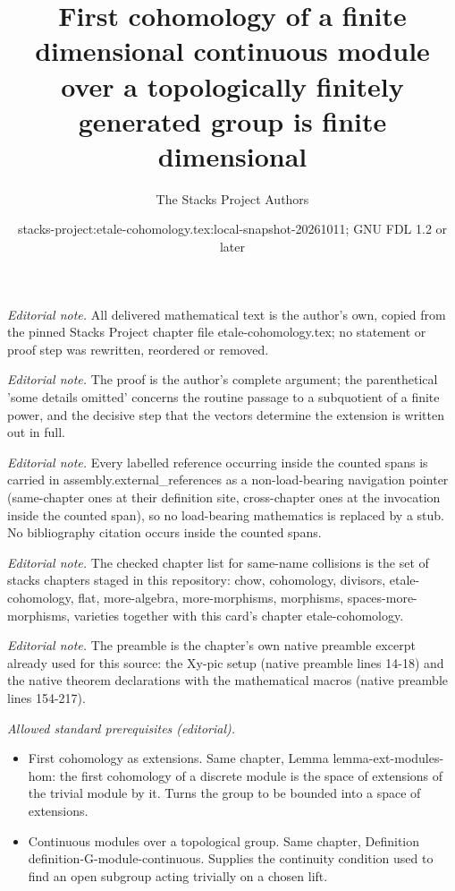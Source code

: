 \documentclass[10pt,a4paper]{amsart}
\title{First cohomology of a finite dimensional continuous module over a topologically finitely generated group is finite dimensional}
\author{The Stacks Project Authors}
\date{stacks-project:etale-cohomology.tex:local-snapshot-20261011; GNU FDL 1.2 or later}
\theoremstyle{plain}
\theoremstyle{definition}
\theoremstyle{remark}
\numberwithin{equation}{subsection}
\begin{document}
\maketitle
\noindent\textit{Editorial note.} All delivered mathematical text is the author's own, copied from the pinned Stacks Project chapter file etale-cohomology.tex; no statement or proof step was rewritten, reordered or removed.\par\medskip
\noindent\textit{Editorial note.} The proof is the author's complete argument; the parenthetical 'some details omitted' concerns the routine passage to a subquotient of a finite power, and the decisive step that the vectors determine the extension is written out in full.\par\medskip
\noindent\textit{Editorial note.} Every labelled reference occurring inside the counted spans is carried in assembly.external\_references as a non-load-bearing navigation pointer (same-chapter ones at their definition site, cross-chapter ones at the invocation inside the counted span), so no load-bearing mathematics is replaced by a stub. No bibliography citation occurs inside the counted spans.\par\medskip
\noindent\textit{Editorial note.} The checked chapter list for same-name collisions is the set of stacks chapters staged in this repository: chow, cohomology, divisors, etale-cohomology, flat, more-algebra, more-morphisms, morphisms, spaces-more-morphisms, varieties together with this card's chapter etale-cohomology.\par\medskip
\noindent\textit{Editorial note.} The preamble is the chapter's own native preamble excerpt already used for this source: the Xy-pic setup (native preamble lines 14-18) and the native theorem declarations with the mathematical macros (native preamble lines 154-217).\par\medskip
\noindent\textit{Allowed standard prerequisites (editorial).}\begin{itemize}
\item First cohomology as extensions. Same chapter, Lemma lemma-ext-modules-hom: the first cohomology of a discrete module is the space of extensions of the trivial module by it. Turns the group to be bounded into a space of extensions.
\item Continuous modules over a topological group. Same chapter, Definition definition-G-module-continuous. Supplies the continuity condition used to find an open subgroup acting trivially on a chosen lift.
\end{itemize}\medskip
\end{document}
